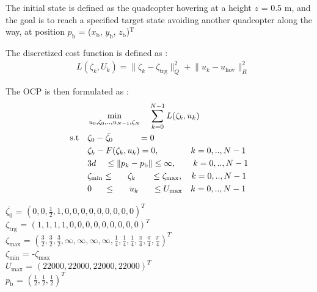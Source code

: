 \documentclass[conference]{IEEEtran}
\begin{document}
The initial state is defined as the quadcopter hovering at a height $z$ = 0.5 m, and the goal is to reach a specified target state avoiding another quadcopter along the way, at position  $p_\mathrm{b}$ = ($x_\mathrm{b}$, $y_\mathrm{b}$, $z_\mathrm{b}$)$\mathrm{^{T}}$

The discretized cost function is defined as :
\begin{align}
	& L\left(\zeta_k, U_k\right) = \lVert \zeta_k - \zeta_{\mathrm{trg}} \rVert^2_Q + \lVert u_k - u_{\mathrm{hov}} \rVert^2_R
\end{align}

The OCP is then formulated as :
\begin{align}
	&\min_{u_0,\zeta_0,..,u_{N-1},\zeta_N} \quad \sum_{k = 0}^{N-1} L(\zeta_k, u_k) \\
	\text{s.t} \quad 
	& \zeta_0 - \bar{\zeta_0} \hspace{0.42in} = 0\\
    & \zeta_k - F(\zeta_k, u_k) = 0, \hspace{0.1in}\quad\qquad k = 0,..,N-1 \\
    & 3d \hspace{0.15in} \le \lVert p_k - p_{\mathrm{b}} \rVert \le  \infty, \qquad  k = 0,..,N-1 \\
	& \zeta_{\mathrm{min}} \le \hspace{0.22in} \zeta_k \hspace{0.25in} \le \zeta_{\mathrm{max}}, \quad k = 0,..,N-1 \\
    & 0 \hspace{0.2in} \le \hspace{0.23in} u_k \hspace{0.22in} \le U_{\mathrm{max}} \quad k = 0,..,N-1
\end{align}

\begin{flushleft}
$\bar{\zeta_0}$ \hspace{0.18in}= $(0, 0, \frac{1}{2}, 1, 0, 0, 0, 0, 0, 0, 0, 0, 0)^T$\\
$\zeta_{\mathrm{trg}}$ \hspace{0.08in}= $( 1, 1, 1, 1, 0, 0, 0, 0, 0, 0, 0, 0, 0)^T$\\
$\zeta_{\mathrm{max}}$ \hspace{0.03in}= $(\frac{3}{2},\frac{3}{2},\frac{3}{2},\infty,\infty,\infty,\infty,\frac{1}{4},\frac{1}{4},\frac{1}{4},\frac{\pi}{4},\frac{\pi}{4},\frac{\pi}{4})^T$\\
$\zeta_{\mathrm{min}}$ \hspace{0.05in}= -$\zeta_{\mathrm{max}}$\\
$U_{\mathrm{max}}$ = $(22000, 22000, 22000, 22000)^T$\\
$p_\mathrm{b}$ \hspace{0.18in}= $(\frac{1}{2}, \frac{1}{2}, \frac{1}{2})^T$\\
\end{flushleft}
\end{document}
